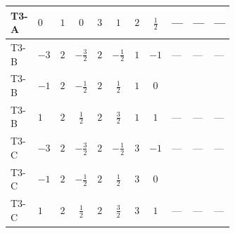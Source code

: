 \documentclass[8pt]{article}
\begin{document}
\begin{landscape}
\begin{longtable}{@{}llcccccc >{\raggedright\arraybackslash}p{0.21\linewidth} >{\raggedright\arraybackslash}p{0.21\linewidth} >{\raggedright\arraybackslash}p{0.21\linewidth}@{}}
\midrule
T3-A & $0$ & $1$ & $0$ & $3$ & $1$ & $2$ & $\frac{1}{2}$ & --- & --- & --- \\
\midrule
T3-B & $-3$ & $2$ & $-\frac{3}{2}$ & $2$ & $-\frac{1}{2}$ & $1$ & $-1$ & --- & --- & --- \\
\midrule
T3-B & $-1$ & $2$ & $-\frac{1}{2}$ & $2$ & $\frac{1}{2}$ & $1$ & $0$ & \scriptsize\adjustbox{max width=\linewidth}{$\begin{gathered} +2 {\lambda_{H H^\dagger S_1^\dagger S_2^\dagger}^{\rm Cross}} \left({\lambda_{H H^\dagger S_1^\dagger S_2^\dagger}^{\rm Cross}}\right)^{*}\end{gathered}$} & \scriptsize\adjustbox{max width=\linewidth}{$\begin{gathered} +24 {\lambda_{9}} \left({\lambda_{9}}\right)^{*}\end{gathered}$} & \scriptsize\adjustbox{max width=\linewidth}{$\begin{gathered} +9 {\lambda_{10}} (\left({\lambda_{10}}\right)^{*}+\left({\lambda_{11}}\right)^{*}) \\ +9 {\lambda_{11}} (\left({\lambda_{10}}\right)^{*}+\left({\lambda_{11}}\right)^{*})\end{gathered}$} \\
\midrule
T3-B & $1$ & $2$ & $\frac{1}{2}$ & $2$ & $\frac{3}{2}$ & $1$ & $1$ & --- & --- & --- \\
\midrule
T3-C & $-3$ & $2$ & $-\frac{3}{2}$ & $2$ & $-\frac{1}{2}$ & $3$ & $-1$ & --- & --- & --- \\
\midrule
T3-C & $-1$ & $2$ & $-\frac{1}{2}$ & $2$ & $\frac{1}{2}$ & $3$ & $0$ & \scriptsize\adjustbox{max width=\linewidth}{$\begin{gathered} +2 {\lambda_{H H^\dagger S_1^\dagger S_2^\dagger}^{\rm Cross}} \left({\lambda_{H H^\dagger S_1^\dagger S_2^\dagger}^{\rm Cross}}\right)^{*}\end{gathered}$} & \scriptsize\adjustbox{max width=\linewidth}{$\begin{gathered} +24 {\lambda_{9}} \left({\lambda_{9}}\right)^{*}\end{gathered}$} & \scriptsize\adjustbox{max width=\linewidth}{$\begin{gathered} +9 {\lambda_{10}} (\left({\lambda_{10}}\right)^{*}+\left({\lambda_{11}}\right)^{*}) \\ +9 {\lambda_{11}} (\left({\lambda_{10}}\right)^{*}+\left({\lambda_{11}}\right)^{*})\end{gathered}$} \\
\midrule
T3-C & $1$ & $2$ & $\frac{1}{2}$ & $2$ & $\frac{3}{2}$ & $3$ & $1$ & --- & --- & --- \\

\end{longtable}
\end{landscape}
\end{document}
